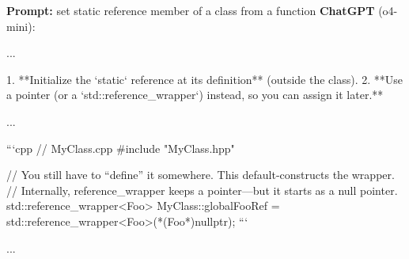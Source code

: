 \textbf{Prompt:} set static reference member of a class from a function
\tcblower
\textbf{ChatGPT} (o4-mini):\par
\begin{markdown}
...

1. **Initialize the `static` reference at its definition** (outside the class).  
2. **Use a pointer (or a `std::reference_wrapper`) instead, so you can assign it later.**

...

```cpp
// MyClass.cpp
#include "MyClass.hpp"

// You still have to “define” it somewhere. This default-constructs the wrapper.
// Internally, reference_wrapper keeps a pointer—but it starts as a null pointer.
std::reference_wrapper<Foo> MyClass::globalFooRef = std::reference_wrapper<Foo>(*(Foo*)nullptr);
```

...
\end{markdown}
